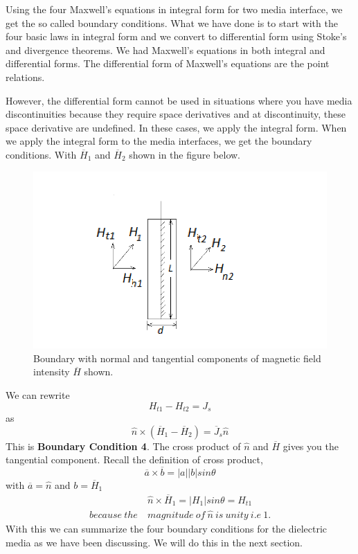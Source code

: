Using the four Maxwell's equations in integral form for two media interface, we get the so called boundary conditions. What we have done is to start with the four basic laws in integral form and we convert to differential form using Stoke's and divergence theorems. We had Maxwell's equations in both integral and differential forms. The differential form of Maxwell's equations are the point relations.

However, the differential form cannot be used in situations where you have media discontinuities because they require space derivatives and at discontinuity, these space derivative are undefined. In these cases, we apply the integral form. When we apply the integral form to the media interfaces, we get the boundary conditions. With $\overline{H}_1$ and $\overline{H}_2$ shown in the figure below.
\begin{figure}[h]
\centering
\includegraphics[width=1\linewidth]{./graphics/diemedium4_2_2}
\caption{Boundary with normal and tangential components of magnetic field intensity $\overline{H}$ shown.}
\end{figure}

We can rewrite 
\begin{equation*}
H_{t1} - H_{t2} = J_s
\end{equation*}
as
\begin{equation}
\hat{n} \times (\overline{H}_1 - \overline{H}_2) = \overline{J}_s\hat{n}
\end{equation}
This is \textbf{Boundary Condition 4}. The cross product of $\hat{n}$ and $\overline{H}$ gives you the tangential component. Recall the definition of cross product,
\begin{equation*}
\overline{a}\times\overline{b} = \left|a \right| \left|b \right|sin\theta 
\end{equation*}
with $\overline{a} = \hat{n}$ and $ b = \overline{H}_1$
\begin{align*}
&\hat{n}\times\overline{H}_1 = \left|H_1 \right|sin\theta = H_{t1} \\ because\ the\ & magnitude\ of\ \hat{n}\ is\ unity\ i.e\ 1.
\end{align*}
With this we can summarize the four boundary conditions for the dielectric media as we have been discussing. We will do this in the next section.

